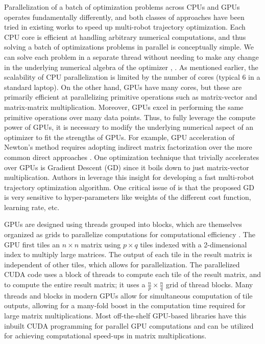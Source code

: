 Parallelization of a batch of optimization problems across CPUs and GPUs operates fundamentally differently, and both classes of approaches have been tried in existing works to speed up multi-robot trajectory optimization. Each CPU core is efficient at handling arbitrary numerical computations, and thus solving a batch of optimizations problems in parallel is conceptually simple. We can solve each problem in a separate thread without needing to make any change in the underlying numerical algebra of the optimizer \citep{aks_behavior_ral22}, \citep{alonso_mora_nips_multi}. As mentioned earlier, the scalability of CPU parallelization is limited by the number of cores (typical 6 in a standard laptop). On the other hand, GPUs have many cores, but these are primarily efficient at parallelizing primitive operations such as matrix-vector and matrix-matrix multiplication.
Moreover, GPUs excel in performing the same primitive operations over many data points. Thus, to fully leverage the compute power of GPUs, it is necessary to modify the underlying numerical aspect of an optimizer to fit the strengths of GPUs. For example, GPU acceleration of Newton's method requires adopting indirect matrix factorization over the more common direct approaches \citep{newton_gpu}. One optimization technique that trivially accelerates over GPUs is Gradient Descent (GD) since it boils down to just matrix-vector multiplication. Authors in \citep{rafaella_gpu} leverage this insight for developing a fast multi-robot trajectory optimization algorithm. One critical issue of \citep{rafaella_gpu} is that the proposed GD is very sensitive to hyper-parameters like weights of the different cost function, learning rate, etc.



GPUs are designed using threads grouped into blocks, which are themselves organized as grids to parallelize computations for computational efficiency \citep{li_GPUmatmul}. The GPU first tiles an $n \times n$ matrix using $p \times q$ tiles indexed with a 2-dimensional index to multiply large matrices. The output of each tile in the result matrix is independent of other tiles, which allows for parallelization. The parallelized CUDA code uses a block of threads to compute each tile of the result matrix, and to compute the entire result matrix; it uses a $\frac{n}{p} \times \frac{n}{q}$ grid of thread blocks. Many threads and blocks in modern GPUs allow for simultaneous computation of tile outputs, allowing for a many-fold boost in the computation time required for large matrix multiplications. Most off-the-shelf GPU-based libraries have this inbuilt CUDA programming for parallel GPU computations and can be utilized for achieving computational speed-ups in matrix multiplications.


